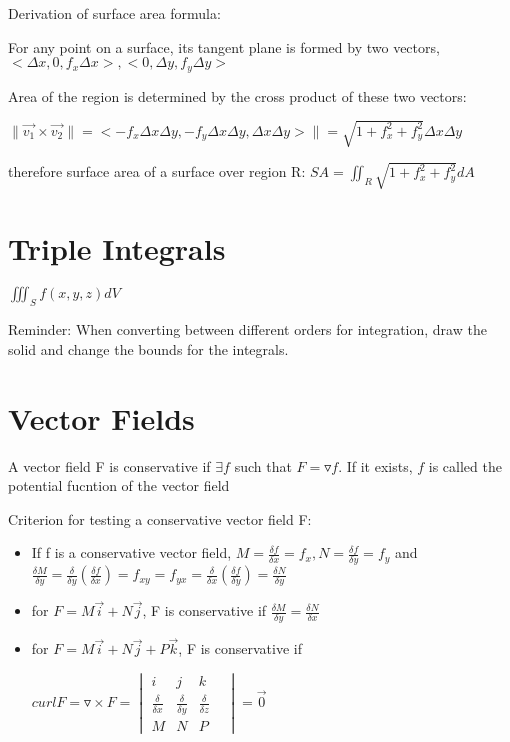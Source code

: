 \documentclass [12 pt, oneside] {book}
\begin{document}
Derivation of surface area formula:

\begin{center}

For any point on a surface, its tangent plane is formed by two vectors, $<\Delta x, 0, f_x\Delta x>, <0,\Delta y, f_y\Delta y>$

Area of the region is determined by the cross product of these two vectors: 

$\|\vec{v_1}\times\vec{v_2}\|=<-f_x\Delta x\Delta y, -f_y\Delta x\Delta y, \Delta x\Delta y>\|=\sqrt{1+f_x^2+f_y^2}\Delta x\Delta y$

therefore surface area of a surface over region R: $SA=\iint_R \sqrt{1+f_x^2+f_y^2} dA$
\end{center}

\section{Triple Integrals}

$\iiint_S f(x,y,z)dV$

Reminder: When converting between different orders for integration, draw the solid and change the bounds for the integrals.  

\section{Vector Fields}

A vector field F is conservative if $\exists f$ such that $F = \triangledown f$. If it exists, $f$ is called the potential fucntion of the vector field

Criterion for testing a conservative vector field F:
\begin{itemize}
	\item If f is a conservative vector field, $M=\frac{\delta f}{\delta x}=f_x, N=\frac{\delta f}{\delta y}=f_y$ and $\frac{\delta M}{\delta y}=\frac{\delta}{\delta y}(\frac{\delta f}{\delta x})=f_{xy}=f_{yx}=\frac{\delta}{\delta x}(\frac{\delta f}{\delta y})=\frac{\delta N}{\delta y}$  
	\item for $F=M\vec{i}+N\vec{j}$, F is conservative if $\frac{\delta M}{\delta y}=\frac{\delta N}{\delta x}$ 
	\item for $F=M\vec{i}+N\vec{j}+P\vec{k}$, F is conservative if 
\begin{center}
	$curl F = \triangledown\times F= 
	\begin{vmatrix}
		i & j & k \\
		\frac{\delta}{\delta x} & \frac{\delta}{\delta y} & \frac{\delta}{\delta z} & \\
		M & N & P
	\end{vmatrix}
	=\vec{0}$
	\end{center}
\end{itemize}
\end{document}
